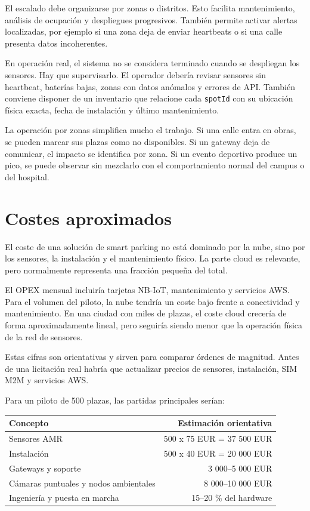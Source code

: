 \documentclass[11pt,a4paper]{article}
\begin{document}
El escalado debe organizarse por zonas o distritos. Esto facilita mantenimiento, análisis de ocupación y despliegues progresivos. También permite activar alertas localizadas, por ejemplo si una zona deja de enviar heartbeats o si una calle presenta datos incoherentes.

En operación real, el sistema no se considera terminado cuando se despliegan los sensores. Hay que supervisarlo. El operador debería revisar sensores sin heartbeat, baterías bajas, zonas con datos anómalos y errores de API. También conviene disponer de un inventario que relacione cada \texttt{spotId} con su ubicación física exacta, fecha de instalación y último mantenimiento.

La operación por zonas simplifica mucho el trabajo. Si una calle entra en obras, se pueden marcar sus plazas como no disponibles. Si un gateway deja de comunicar, el impacto se identifica por zona. Si un evento deportivo produce un pico, se puede observar sin mezclarlo con el comportamiento normal del campus o del hospital.

\section{Costes aproximados}

El coste de una solución de smart parking no está dominado por la nube, sino por los sensores, la instalación y el mantenimiento físico. La parte cloud es relevante, pero normalmente representa una fracción pequeña del total.

El OPEX mensual incluiría tarjetas NB-IoT, mantenimiento y servicios AWS. Para el volumen del piloto, la nube tendría un coste bajo frente a conectividad y mantenimiento. En una ciudad con miles de plazas, el coste cloud crecería de forma aproximadamente lineal, pero seguiría siendo menor que la operación física de la red de sensores.

Estas cifras son orientativas y sirven para comparar órdenes de magnitud. Antes de una licitación real habría que actualizar precios de sensores, instalación, SIM M2M y servicios AWS.

Para un piloto de 500 plazas, las partidas principales serían:

\begin{longtable}{P{8cm}r}
\toprule
\textbf{Concepto} & \textbf{Estimación orientativa} \\
\midrule
\endhead
Sensores AMR & 500 x 75 EUR = 37 500 EUR \\
Instalación & 500 x 40 EUR = 20 000 EUR \\
Gateways y soporte & 3 000--5 000 EUR \\
Cámaras puntuales y nodos ambientales & 8 000--10 000 EUR \\
Ingeniería y puesta en marcha & 15--20 \% del hardware \\
\bottomrule
\end{longtable}
\end{document}
